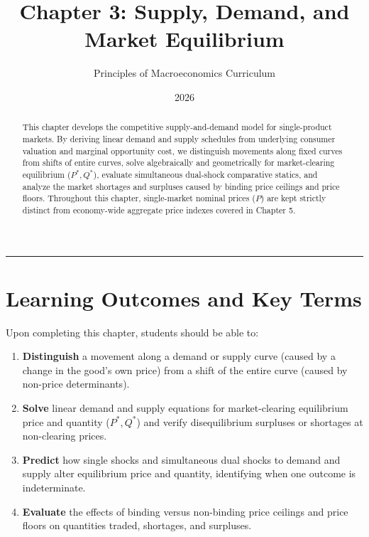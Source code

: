 \documentclass[11pt,letterpaper]{article}
\begin{document}
\title{\Huge\bfseries\color{SlateBlue} Chapter 3: Supply, Demand, and Market Equilibrium}
\author{\large Principles of Macroeconomics Curriculum}
\date{2026}
\maketitle

\thispagestyle{plain}

\begin{abstract}
This chapter develops the competitive supply-and-demand model for single-product markets. By deriving linear demand and supply schedules from underlying consumer valuation and marginal opportunity cost, we distinguish movements along fixed curves from shifts of entire curves, solve algebraically and geometrically for market-clearing equilibrium ($P^*, Q^*$), evaluate simultaneous dual-shock comparative statics, and analyze the market shortages and surpluses caused by binding price ceilings and price floors. Throughout this chapter, single-market nominal prices ($P$) are kept strictly distinct from economy-wide aggregate price indexes covered in Chapter 5.
\end{abstract}

\tableofcontents
\vspace{1.5em}
\hrule
\vspace{1.5em}

\section*{Learning Outcomes and Key Terms}

Upon completing this chapter, students should be able to:
\begin{enumerate}
  \item \textbf{Distinguish} a movement along a demand or supply curve (caused by a change in the good's own price) from a shift of the entire curve (caused by non-price determinants).
  \item \textbf{Solve} linear demand and supply equations for market-clearing equilibrium price and quantity ($P^*, Q^*$) and verify disequilibrium surpluses or shortages at non-clearing prices.
  \item \textbf{Predict} how single shocks and simultaneous dual shocks to demand and supply alter equilibrium price and quantity, identifying when one outcome is indeterminate.
  \item \textbf{Evaluate} the effects of binding versus non-binding price ceilings and price floors on quantities traded, shortages, and surpluses.
\end{enumerate}
\end{document}
